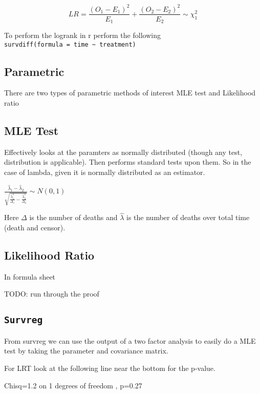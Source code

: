 \documentclass[
  letterpaper,
  DIV=11,
  numbers=noendperiod]{scrreprt}
\begin{document}
\[ LR = \frac{(O_1 - E_1)^2}{E_1} + \frac{(O_2 - E_2)^2}{E_2} \sim \chi^2_{1}\]

To perform the logrank in r perform the following
\texttt{survdiff(formula\ =\ \textquotesingle{}time\ \textasciitilde{}\ treatment\textquotesingle{})}

\hypertarget{parametric}{%
\subsection{Parametric}\label{parametric}}

There are two types of parametric methods of interest MLE test and
Likelihood ratio

\hypertarget{mle-test}{%
\subsection{MLE Test}\label{mle-test}}

Effectively looks at the paramters as normally distributed (though any
test, distribution is applicable). Then performs standard tests upon
them. So in the case of lambda, given it is normally distributed as an
estimator.

\(\frac{\hat{\lambda}_1 - \hat{\lambda}_2}{\sqrt{\frac{\hat{\lambda}_1^2}{\Delta_1}-\frac{\hat{\lambda}_2^2}{\Delta_2}}} \sim N(0,1)\)

Here \(\Delta\) is the number of deaths and \(\hat{\lambda}\) is the
number of deaths over total time (death and censor).

\hypertarget{likelihood-ratio}{%
\subsection{Likelihood Ratio}\label{likelihood-ratio}}

In formula sheet

TODO: run through the proof

\hypertarget{survreg}{%
\subsection{\texorpdfstring{\texttt{Survreg}}{Survreg}}\label{survreg}}

From survreg we can use the output of a two factor analysis to easily do
a MLE test by taking the parameter and covariance matrix.

For LRT look at the following line near the bottom for the p-value.

Chisq=1.2 on 1 degrees of freedom , p=0.27
\end{document}
